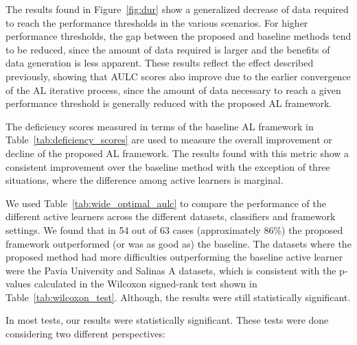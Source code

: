 \documentclass[preprint,12pt]{elsarticle}
\begin{document}
The results found in Figure~\ref{fig:dur} show a generalized decrease of data
required to reach the performance thresholds in the various scenarios. For
higher performance thresholds, the gap between the proposed and baseline
methods tend to be reduced, since the amount of data required is larger and
the benefits of data generation is less apparent. These results reflect the
effect described previously, showing that AULC scores also improve due to the
earlier convergence of the AL iterative process, since the amount of data
necessary to reach a given performance threshold is generally reduced with the
proposed AL framework.

The deficiency scores measured in terms of the baseline AL framework in
Table~\ref{tab:deficiency_scores} are used to measure the overall improvement
or decline of the proposed AL framework. The results found with this metric
show a consistent improvement over the baseline method with the exception of
three situations, where the difference among active learners is marginal.

We used Table~\ref{tab:wide_optimal_aulc} to compare the performance of the
different active learners across the different datasets, classifiers and
framework settings. We found that in 54 out of 63 cases (approximately 86\%)
the proposed framework outperformed (or was as good as) the baseline. The
datasets where the proposed method had more difficulties outperforming the
baseline active learner were the Pavia University and Salinas A datasets,
which is consistent with the p-values calculated in the Wilcoxon signed-rank
test shown in Table~\ref{tab:wilcoxon_test}. Although, the results were still
statistically significant.

In most tests, our results were statistically significant. These tests were
done considering two different perspectives:
\end{document}
